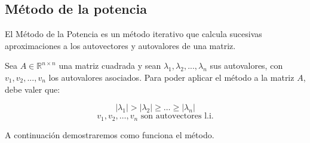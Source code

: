 \newpage
\subsection{Método de la potencia}\label{metodo_potencia}

El Método de la Potencia es un método iterativo que calcula sucesivas aproximaciones a los autovectores y autovalores de una matriz.

Sea $A\in\mathbb{R}^{n \times n}$ una matriz cuadrada y sean $\lambda_1,\lambda_2,...,\lambda_n$
sus autovalores, con $v_1,v_2,...,v_n$ los autovalores asociados. Para poder aplicar el método a
la matriz $A$, debe valer que:

$$|\lambda_1| > |\lambda_2| \geq \dots \geq |\lambda_n|$$
$$v_1, v_2, \dots, v_n \text{ son autovectores l.i.}$$

A continuación demostraremos como funciona el método.

